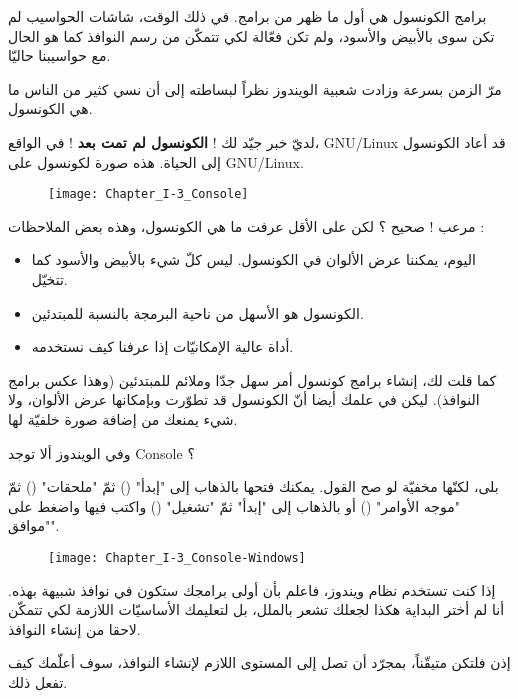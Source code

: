 برامج الكونسول هي أول ما ظهر من برامج. في ذلك الوقت، شاشات الحواسيب لم تكن سوى بالأبيض والأسود، ولم تكن فعّالة لكي تتمكّن من رسم النوافذ كما هو الحال مع حواسيبنا حاليّا.

مرّ الزمن بسرعة وزادت شعبية الويندوز نظراً لبساطته إلى أن نسي كثير من الناس ما هي الكونسول.

لديّ خبر جيّد لك !
\textbf{الكونسول لم تمت بعد} !
 في الواقع،
\textenglish{GNU/Linux}
 قد أعاد الكونسول إلى الحياة. هذه صورة لكونسول على
\textenglish{GNU/Linux}.

\begin{figure}[H]
	\centering
	\texttt{[image: Chapter\_I-3\_Console]}
\end{figure}

مرعب ! صحيح ؟ لكن على الأقل عرفت ما هي الكونسول، وهذه بعض الملاحظات :

\begin{itemize}
  \item اليوم، يمكننا عرض الألوان في الكونسول. ليس كلّ شيء بالأبيض والأسود كما تتخيّل.
  \item الكونسول هو الأسهل من ناحية البرمجة بالنسبة للمبتدئين.
  \item أداة عالية الإمكانيّات إذا عرفنا كيف نستخدمه.
\end{itemize}

كما قلت لك، إنشاء برامج كونسول أمر سهل جدّا وملائم للمبتدئين (وهذا عكس برامج النوافذ). ليكن في علمك أيضا أنّ الكونسول قد تطوّرت وبإمكانها عرض الألوان، ولا شيء يمنعك من إضافة صورة خلفيّة لها.

\begin{question}
  وفي الويندوز ألا توجد
\textenglish{Console}
 ؟
\end{question}

بلى، لكنّها مخفيّة لو صح القول. يمكنك فتحها بالذهاب إلى "إبدأ"
()
 ثمّ "ملحقات"
()
 ثمّ "موجه الأوامر"
()
 أو بالذهاب إلى "إبدأ" ثمّ "تشغيل"
()
 واكتب فيها
 واضغط على "موافق".

\begin{figure}[H]
	\centering
	\texttt{[image: Chapter\_I-3\_Console-Windows]}
\end{figure}

إذا كنت تستخدم نظام ويندوز، فاعلم بأن أولى برامجك ستكون في نوافذ شبيهة بهذه. أنا لم أختر البداية هكذا لجعلك تشعر بالملل، بل لتعليمك الأساسيّات اللازمة لكي تتمكّن لاحقا من إنشاء النوافذ.

إذن فلتكن متيقّناً، بمجرّد أن تصل إلى المستوى اللازم لإنشاء النوافذ، سوف أعلّمك كيف تفعل ذلك.

